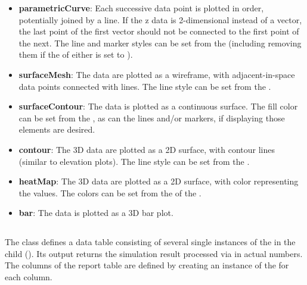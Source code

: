 \begin{blockChanged}
\begin{itemize}
\item \textbf{parametricCurve}: Each successive data point is plotted in order, potentially joined by a line.  If the z data is 2-dimensional instead of a vector, the last point of the first vector should not be connected to the first point of the next.  The line and marker styles can be set from the  (including removing them if the  of either is set to ).
\item \textbf{surfaceMesh}: The data are plotted as a wireframe, with adjacent-in-space data points connected with lines.  The line style can be set from the .
\item \textbf{surfaceContour}: The data is plotted as a continuous surface.  The fill color can be set from the , as can the lines and/or markers, if displaying those elements are desired.
\item \textbf{contour}:  The 3D data are plotted as a 2D surface, with contour lines (similar to elevation plots).  The line style can be set from the .
\item \textbf{heatMap}:  The 3D data are plotted as a 2D surface, with color representing the values.  The colors can be set from the  of the .
\item \textbf{bar}: The data is plotted as a 3D bar plot.
\end{itemize}



\end{blockChanged}
%




\subsection{}
\label{class:report}
\label{class:listOfDataSets}
\begin{blockChanged}
The  class defines a data table consisting of several single instances of the \DataSet in the child  (). Its output returns the simulation result processed via \DataGenerators in actual numbers. The columns of the report table are defined by creating an instance of the \DataSet for each column. 
\end{blockChanged}


